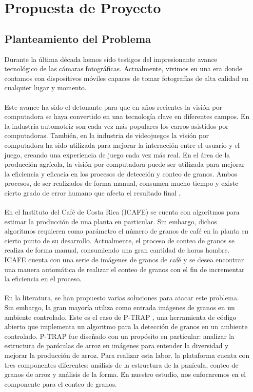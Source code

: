 \section{\textbf{Propuesta de Proyecto}}\label{propuesta} 
\subsection{Planteamiento del Problema}
Durante la \'ultima d\'ecada hemos sido testigos del impresionante avance tecnol\'ogico de las c\'amaras fotogr\'aficas. Actualmente, vivimos en una era donde contamos con dispositivos m\'oviles capaces de tomar fotograf\'ias de alta calidad en cualquier lugar y momento. 
\\\\
Este avance ha sido el detonante para que en a\~nos recientes la visi\'on por computadora se haya convertido en una tecnolog\'ia clave en diferentes campos. En la industria automotriz son cada vez m\'as populares los carros asistidos por computadoras. Tambi\'en, en la industria de videojuegos la visi\'on por computadora ha sido utilizada para mejorar la interacci\'on entre el usuario y el juego, creando una experiencia de juego cada vez m\'as real. En el \'area de la producci\'on agr\'icola, la visi\'on por computadora puede ser utilizada para mejorar la eficiencia y eficacia en los procesos de detecci\'on y conteo de granos. Ambos procesos, de ser realizados de forma manual, consumen mucho tiempo y existe cierto grado de error humano que afecta el resultado final \cite{klette}.
\\\\
En el Instituto del Caf\'e de Costa Rica (ICAFE) se cuenta con algoritmos para estimar la producci\'on de una planta en particular. Sin embargo, dichos algoritmos requieren como par\'ametro el n\'umero de granos de caf\'e en la planta en cierto punto de su desarrollo. Actualmente, el proceso de conteo de granos se realiza de forma manual, consumiendo una gran cantidad de horas hombre. ICAFE cuenta con una serie de im\'agenes de granos de caf\'e y se desea encontrar una manera autom\'atica de realizar el conteo de granos con el fin de incrementar la eficiencia en el proceso.
\\\\
En la literatura, se han propuesto varias soluciones para atacar este problema. Sin embargo, la gran mayor\'ia utiliza como entrada im\'agenes de granos en un ambiente controlado. Este es el caso de P-TRAP \cite{ptrap}, una herramienta de c\'odigo abierto que implementa un algoritmo para la detecci\'on de granos en un ambiente controlado. P-TRAP fue dise\~nado con un prop\'osito en particular: analizar la estructura  de pan\'iculas de arroz en im\'agenes para entender la diversidad y mejorar la producci\'on de arroz. Para realizar esta labor, la plataforma cuenta con tres componentes diferentes: an\'alisis de la estructura de la pan\'icula, conteo de granos de arroz y an\'alisis de la forma. En nuestro estudio, nos enfocaremos en el componente para el conteo de granos.
